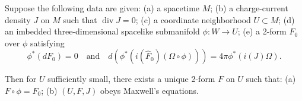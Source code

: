 Suppose the following data are given: (a) a spacetime $M$; (b) a charge-current density $J$ on $M$ such that $\operatorname{div} J = 0$; (c) a coordinate neighborhood $U \subset M$; (d) an imbedded three-dimensional spacelike submanifold $\phi: W \rightarrow U$; (e) a 2-form $F_0$ over $\phi$ satisfying $$\phi^*(dF_0) = 0 \quad\text{and}\quad d(\phi^*(i(\hat{F}_0)(\Omega \circ \phi))) = 4\pi\phi^*(i(J)\Omega).$$

Then for $U$ sufficiently small, there exists a unique 2-form $F$ on $U$ such that: (a) $F \circ \phi = F_0$; (b) $(U, F, J)$ obeys Maxwell's equations.

